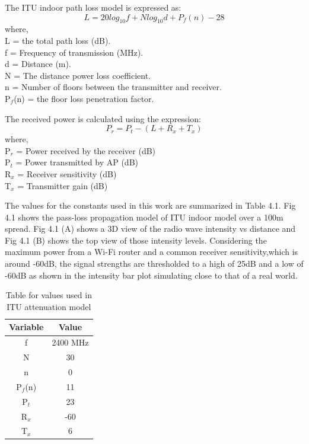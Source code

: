 The ITU indoor path loss model is expressed as\cite{31}:
\begin{equation}
    L = 20log_{10}f + Nlog_{10}d + P_f(n) - 28
\end{equation}
where,\\
L = the total path loss (dB).\\
f = Frequency of transmission (MHz).\\
d = Distance (m).\\
N = The distance power loss coefficient.\\
n = Number of floors between the transmitter and receiver.\\
P$_f$(n) = the floor loss penetration factor.

The received power is calculated using the expression:
\begin{equation}
    P_r = P_t - (L + R_x + T_x)
\end{equation}
where,\\
P$_r$ = Power received by the receiver (dB)\\
P$_t$ = Power transmitted by AP (dB)\\
R$_x$ = Receiver sensitivity (dB)\\
T$_x$ = Transmitter gain (dB)

The values for the constants used in this work are summarized in Table 4.1. Fig 4.1 shows the pass-loss propagation model of ITU indoor model over a 100m spread. Fig 4.1 (A) shows a 3D view of the radio wave intensity vs distance and Fig 4.1 (B) shows the top view of those intensity levels. Considering the maximum power from a Wi-Fi router and a common receiver sensitivity,which is around -60dB, the signal strengths are thresholded to a high of 25dB and a low of -60dB as shown in the intensity bar plot simulating close to that of a real world. 

\begin{table}[h!]
\centering
\begin{tabular}{c c}
\hline
Variable & Value\\
\hline
f        & 2400 MHz\\
N        & 30\\
n        & 0\\
P$_f$(n) & 11\\
P$_t$    & 23\\
R$_x$    & -60\\
T$_x$    & 6\\
\hline
\end{tabular}
\caption{Table for values used in ITU attenuation model}
\label{table:1}
\end{table}

